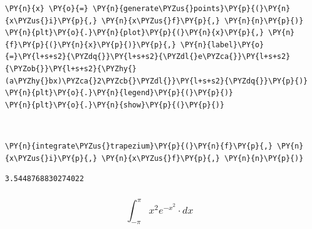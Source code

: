     \begin{tcolorbox}[breakable, size=fbox, boxrule=1pt, pad at break*=1mm,colback=cellbackground, colframe=cellborder]
\begin{Verbatim}[commandchars=\\\{\}]
\PY{n}{x} \PY{o}{=} \PY{n}{generate\PYZus{}points}\PY{p}{(}\PY{n}{x\PYZus{}i}\PY{p}{,} \PY{n}{x\PYZus{}f}\PY{p}{,} \PY{n}{n}\PY{p}{)}
\PY{n}{plt}\PY{o}{.}\PY{n}{plot}\PY{p}{(}\PY{n}{x}\PY{p}{,} \PY{n}{f}\PY{p}{(}\PY{n}{x}\PY{p}{)}\PY{p}{,} \PY{n}{label}\PY{o}{=}\PY{l+s+s2}{\PYZdq{}}\PY{l+s+s2}{\PYZdl{}e\PYZca{}}\PY{l+s+s2}{\PYZob{}}\PY{l+s+s2}{\PYZhy{}(a\PYZhy{}bx)\PYZca{}2\PYZcb{}\PYZdl{}}\PY{l+s+s2}{\PYZdq{}}\PY{p}{)}
\PY{n}{plt}\PY{o}{.}\PY{n}{legend}\PY{p}{(}\PY{p}{)}
\PY{n}{plt}\PY{o}{.}\PY{n}{show}\PY{p}{(}\PY{p}{)}
\end{Verbatim}
\end{tcolorbox}

    \begin{center}
    \end{center}
    { \hspace*{\fill} \\}
    
    \begin{tcolorbox}[breakable, size=fbox, boxrule=1pt, pad at break*=1mm,colback=cellbackground, colframe=cellborder]
\begin{Verbatim}[commandchars=\\\{\}]
\PY{n}{integrate\PYZus{}trapezium}\PY{p}{(}\PY{n}{f}\PY{p}{,} \PY{n}{x\PYZus{}i}\PY{p}{,} \PY{n}{x\PYZus{}f}\PY{p}{,} \PY{n}{n}\PY{p}{)}
\end{Verbatim}
\end{tcolorbox}

            \begin{tcolorbox}[breakable, size=fbox, boxrule=.5pt, pad at break*=1mm, opacityfill=0]
\begin{Verbatim}[commandchars=\\\{\}]
3.5448768830274022
\end{Verbatim}
\end{tcolorbox}
        
    \hypertarget{int_-pipi-x2-e-x2-cdot-dx}{%
\subsubsection{\texorpdfstring{\[\int_{-\pi}^{\pi} x^2 e^{-x^2} \cdot dx\]}{\textbackslash int\_\{-\textbackslash pi\}\^{}\{\textbackslash pi\} x\^{}2 e\^{}\{-x\^{}2\} \textbackslash cdot dx}}\label{int_-pipi-x2-e-x2-cdot-dx}}

